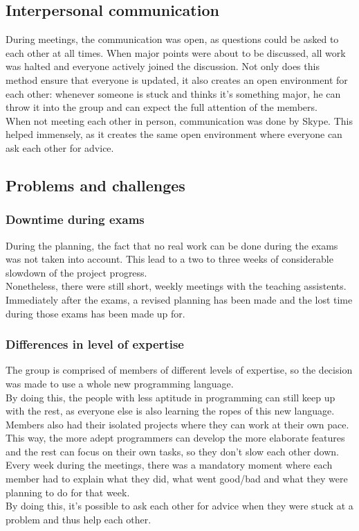 \documentclass[10pt,a4paper]{report}
\begin{document}
		\subsection{Interpersonal communication}
			During meetings, the communication was open, as questions could be asked to each other at all times. When major points were about to be discussed, all work was halted and everyone actively joined the discussion. Not only does this method ensure that everyone is updated, it also creates an open environment for each other: whenever someone is stuck and thinks it's something major, he can throw it into the group and can expect the full attention of the members.\\
			When not meeting each other in person, communication was done by Skype. This helped immensely, as it creates the same open environment where everyone can ask each other for advice.

		\subsection{Problems and challenges}
			\subsubsection*{Downtime during exams}
				During the planning, the fact that no real work can be done during the exams was not taken into account. This lead to a two to three weeks of considerable slowdown of the project progress.\\
				Nonetheless, there were still short, weekly meetings with the teaching assistents. Immediately after the exams, a revised planning has been made and the lost time during those exams has been made up for.
			\subsubsection*{Differences in level of expertise}
				The group is comprised of members of different levels of expertise, so the decision was made to use a whole new programming language.\\ 
				By doing this, the people with less aptitude in programming can still keep up with the rest, as everyone else is also learning the ropes of this new language.\\
				Members also had their isolated projects where they can work at their own pace. This way, the more adept programmers can develop the more elaborate features and the rest can focus on their own tasks, so they don't slow each other down.\\ 
				Every week during the meetings, there was a mandatory moment where each member had to explain what they did, what went good/bad and what they were planning to do for that week.\\ 
				By doing this, it's possible to ask each other for advice when they were stuck at a problem and thus help each other.
\end{document}
